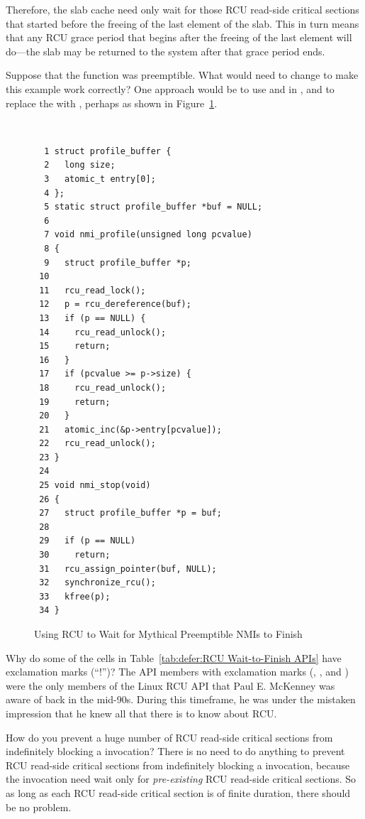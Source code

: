 	Therefore, the slab cache need only wait for those RCU read-side
	critical sections that started before the freeing of the last element
	of the slab.
	This in turn means that any RCU grace period that begins after
	the freeing of the last element will do---the slab may be returned
	to the system after that grace period ends.

\QuickQ{}
	Suppose that the  function was preemptible.
	What would need to change to make this example work correctly?
\QuickA{}
	One approach would be to use
	 and 
	in , and to replace the
	 with ,
	perhaps as shown in
	Figure~\ref{fig:defer:Using RCU to Wait for Mythical Preemptible NMIs to Finish}.

\begin{figure}[tbp]
{ \tt \scriptsize
\begin{verbatim}
  1 struct profile_buffer {
  2   long size;
  3   atomic_t entry[0];
  4 };
  5 static struct profile_buffer *buf = NULL;
  6
  7 void nmi_profile(unsigned long pcvalue)
  8 {
  9   struct profile_buffer *p;
 10
 11   rcu_read_lock();
 12   p = rcu_dereference(buf);
 13   if (p == NULL) {
 14     rcu_read_unlock();
 15     return;
 16   }
 17   if (pcvalue >= p->size) {
 18     rcu_read_unlock();
 19     return;
 20   }
 21   atomic_inc(&p->entry[pcvalue]);
 22   rcu_read_unlock();
 23 }
 24
 25 void nmi_stop(void)
 26 {
 27   struct profile_buffer *p = buf;
 28
 29   if (p == NULL)
 30     return;
 31   rcu_assign_pointer(buf, NULL);
 32   synchronize_rcu();
 33   kfree(p);
 34 }
\end{verbatim}
}
\caption{Using RCU to Wait for Mythical Preemptible NMIs to Finish}
\label{fig:defer:Using RCU to Wait for Mythical Preemptible NMIs to Finish}
\end{figure}


\QuickQ{}
	Why do some of the cells in
	Table~\ref{tab:defer:RCU Wait-to-Finish APIs}
	have exclamation marks (``!'')?
\QuickA{}
	The API members with exclamation marks (,
	, and ) were the
	only members of the Linux RCU API that Paul E. McKenney was aware
	of back in the mid-90s.
	During this timeframe, he was under the mistaken impression that
	he knew all that there is to know about RCU.

\QuickQ{}
	How do you prevent a huge number of RCU read-side critical
	sections from indefinitely blocking a 
	invocation?
\QuickA{}
	There is no need to do anything to prevent RCU read-side
	critical sections from indefinitely blocking a
	 invocation, because the
	 invocation need wait only for
	\emph{pre-existing} RCU read-side critical sections.
	So as long as each RCU read-side critical section is
	of finite duration, there should be no problem.


